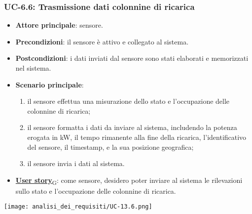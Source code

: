 \subsubsection{UC-6.6: Trasmissione dati colonnine di ricarica}
\begin{itemize}
	\item \textbf{Attore principale}: sensore.
	\item \textbf{Precondizioni}: il sensore è attivo e collegato al sistema.
	\item \textbf{Postcondizioni}: i dati inviati dal sensore sono stati elaborati e memorizzati nel sistema.
	\item \textbf{Scenario principale}:
	      \begin{enumerate}
		      \item il sensore effettua una misurazione dello stato e l'occupazione delle colonnine di ricarica;
		      \item il sensore formatta i dati da inviare al sistema, includendo la potenza erogata in kW, il tempo rimanente alla fine della ricarica, l'identificativo del sensore,
		            il timestamp, e la sua posizione geografica;
		      \item il sensore invia i dati al sistema.
	      \end{enumerate}
	\item \href{https://7last.github.io/docs/rtb/documentazione-interna/glossario\#user-story}{\textbf{User story}\textsubscript{G}}:
	      come sensore, desidero poter inviare al sistema le rilevazioni sullo stato e l'occupazione delle colonnine di ricarica.
\end{itemize}
\begin{center}
	\texttt{[image: analisi\_dei\_requisiti/UC-13.6.png]}
\end{center}

